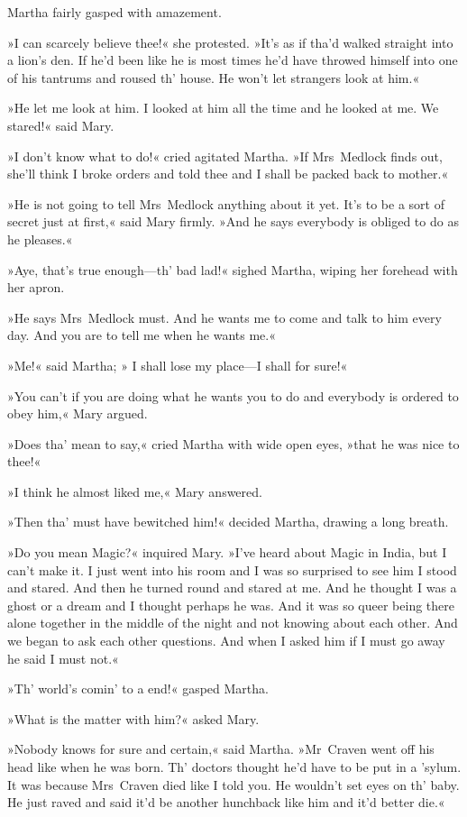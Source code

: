 Martha fairly gasped with amazement.

»I can scarcely believe thee!« she protested. »It's as if tha'd walked straight into a lion's den. If he'd been like he is most times he'd have throwed himself into one of his tantrums and roused th' house. He won't let strangers look at him.«

»He let me look at him. I looked at him all the time and he looked at me. We stared!« said Mary.

»I don't know what to do!« cried agitated Martha. »If Mrs~Medlock finds out, she'll think I broke orders and told thee and I shall be packed back to mother.«

»He is not going to tell Mrs~Medlock anything about it yet. It's to be a sort of secret just at first,« said Mary firmly. »And he says everybody is obliged to do as he pleases.«

»Aye, that's true enough—th' bad lad!« sighed Martha, wiping her forehead with her apron.

»He says Mrs~Medlock must. And he wants me to come and talk to him every day. And you are to tell me when he wants me.«

»Me!« said Martha; » I shall lose my place—I shall for sure!«

»You can't if you are doing what he wants you to do and everybody is ordered to obey him,« Mary argued.

»Does tha' mean to say,« cried Martha with wide open eyes, »that he was nice to thee!«

»I think he almost liked me,« Mary answered.

»Then tha' must have bewitched him!« decided Martha, drawing a long breath.

»Do you mean Magic?« inquired Mary. »I've heard about Magic in India, but I can't make it. I just went into his room and I was so surprised to see him I stood and stared. And then he turned round and stared at me. And he thought I was a ghost or a dream and I thought perhaps he was. And it was so queer being there alone together in the middle of the night and not knowing about each other. And we began to ask each other questions. And when I asked him if I must go away he said I must not.«

»Th' world's comin' to a end!« gasped Martha.

»What is the matter with him?« asked Mary.

»Nobody knows for sure and certain,« said Martha. »Mr~Craven went off his head like when he was born. Th' doctors thought he'd have to be put in a 'sylum. It was because Mrs~Craven died like I told you. He wouldn't set eyes on th' baby. He just raved and said it'd be another hunchback like him and it'd better die.«

